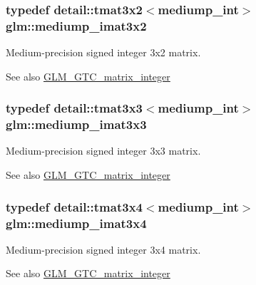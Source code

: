\subsubsection[{mediump\+\_\+imat3x2}]{\setlength{\rightskip}{0pt plus 5cm}typedef detail\+::tmat3x2$<$mediump\+\_\+int$>$ {\bf glm\+::mediump\+\_\+imat3x2}}\label{group__gtc__matrix__integer_ga91a2f7b0b7ab178581d8e10c56904f5d}
Medium-\/precision signed integer 3x2 matrix. \begin{DoxySeeAlso}{See also}
\hyperlink{group__gtc__matrix__integer}{G\+L\+M\+\_\+\+G\+T\+C\+\_\+matrix\+\_\+integer} 
\end{DoxySeeAlso}
\hypertarget{group__gtc__matrix__integer_ga648511f44df045d81db55770887b4354}{}
\subsubsection[{mediump\+\_\+imat3x3}]{\setlength{\rightskip}{0pt plus 5cm}typedef detail\+::tmat3x3$<$mediump\+\_\+int$>$ {\bf glm\+::mediump\+\_\+imat3x3}}\label{group__gtc__matrix__integer_ga648511f44df045d81db55770887b4354}
Medium-\/precision signed integer 3x3 matrix. \begin{DoxySeeAlso}{See also}
\hyperlink{group__gtc__matrix__integer}{G\+L\+M\+\_\+\+G\+T\+C\+\_\+matrix\+\_\+integer} 
\end{DoxySeeAlso}
\hypertarget{group__gtc__matrix__integer_ga2d58e291dd09052a80355106a5a36ea9}{}
\subsubsection[{mediump\+\_\+imat3x4}]{\setlength{\rightskip}{0pt plus 5cm}typedef detail\+::tmat3x4$<$mediump\+\_\+int$>$ {\bf glm\+::mediump\+\_\+imat3x4}}\label{group__gtc__matrix__integer_ga2d58e291dd09052a80355106a5a36ea9}
Medium-\/precision signed integer 3x4 matrix. \begin{DoxySeeAlso}{See also}
\hyperlink{group__gtc__matrix__integer}{G\+L\+M\+\_\+\+G\+T\+C\+\_\+matrix\+\_\+integer} 
\end{DoxySeeAlso}
\hypertarget{group__gtc__matrix__integer_ga49908c8634fad44d78f09c3876c944db}{}

